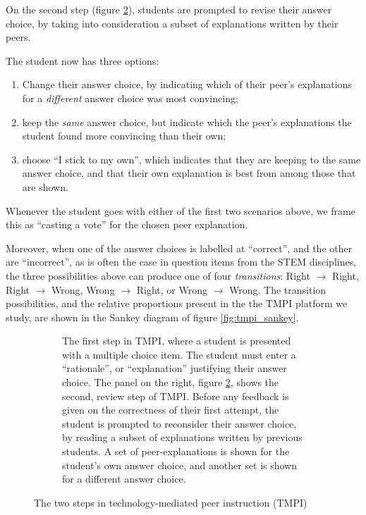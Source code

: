 \documentclass[notitlepage,12pt]{jedm}
\begin{document}
On the second step (figure \ref{fig:question_review}), students are prompted to 
revise 
their answer choice, by taking into consideration a subset of explanations 
written by their peers.

The student now has three options:
\begin{enumerate}
	\item Change their answer choice, by indicating which of their peer's 
	explanations for a \textit{different} answer choice was most convincing;
	\item keep the \textit{same} answer choice, but indicate which the peer's 
	explanations the student found more convincing than their own;
	\item choose ``I stick to my own'', which indicates that they are keeping 
	to the same answer choice, and that their own explanation is best from 
	among those that are shown.
\end{enumerate}

Whenever the student goes with either of the first two scenarios above, we 
frame this as ``casting a vote'' for the chosen peer explanation.

Moreover, when one of the answer choices is labelled at ``correct'', and the 
other are ``incorrect'', as is often the case in question items from the STEM 
disciplines, the three possibilities above can produce one of four 
\textit{transitions}: Right $\rightarrow$ Right, Right $\rightarrow$ Wrong, 
Wrong $\rightarrow$ Right, or Wrong $\rightarrow$ Wrong.
The transition possibilities, and the relative proportions present in the the 
TMPI platform we study, are shown in the Sankey diagram of figure 
\ref{fig:tmpi_sankey}.

\begin{figure}[H]
	\begin{subfigure}[b]{0.4\textwidth}
		\def\svgscale{0.50}
		
		\caption{
			The first step in TMPI, where a student is presented with a 
			multiple choice item. The student must enter a ``rationale'', or 
			``explanation'' justifying their answer choice.
			\newline
			\newline
			The panel on the right, figure \protect\ref{fig:question_review}, 
			shows the second, review step of TMPI.
			Before any feedback is given on the correctness of their first 
			attempt, the student is prompted to reconsider their answer choice, 
			by reading a subset of explanations written by previous students.
			A set of peer-explanations is shown for the student's own answer 
			choice, and another set is shown for a different answer choice. 
		}
		\label{fig:question_start}
	\end{subfigure}
	\qquad
	\begin{subfigure}[b]{0.6\textwidth}
		\def\svgscale{0.50}
		
		\caption{}
		\label{fig:question_review}
	\end{subfigure}
	\caption{The two steps in technology-mediated peer 
		instruction (TMPI)}
	\label{fig:tmpi}
\end{figure}
\end{document}
